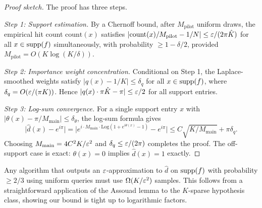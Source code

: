 \begin{proof}[Proof sketch]
The proof has three steps.

\emph{Step 1: Support estimation.}  By a Chernoff bound, after $M_{\mathrm{pilot}}$ uniform draws, the empirical hit count $\mathrm{count}(x)$ satisfies $|\mathrm{count}(x)/M_{\mathrm{pilot}} - 1/N| \leq \varepsilon/(2\pi\hat{K})$ for all $x\in\operatorname{supp}(f)$ simultaneously, with probability $\geq 1-\delta/2$, provided $M_{\mathrm{pilot}} = O(K\log(K/\delta))$.

\emph{Step 2: Importance weight concentration.}  Conditional on Step 1, the Laplace-smoothed weights satisfy $|q(x) - 1/K| \leq \delta_q$ for all $x\in\operatorname{supp}(f)$, where $\delta_q = O(\varepsilon/(\pi K))$.  Hence $|q(x)\cdot\pi\hat{K} - \pi| \leq \varepsilon/2$ for all support entries.

\emph{Step 3: Log-sum convergence.}  For a single support entry $x$ with $|\theta(x) - \pi/M_{\mathrm{main}}| \leq \delta_\theta$, the log-sum formula gives
\[
  \bigl|\hat{d}(x) - e^{i\pi}\bigr| = \bigl|e^{i\cdot M_{\mathrm{main}}\cdot\mathrm{Log}(1 + e^{i\theta(x)}-1)} - e^{i\pi}\bigr| \leq C\sqrt{K/M_{\mathrm{main}}} + \pi\delta_q.
\]
Choosing $M_{\mathrm{main}} = 4C^2K/\varepsilon^2$ and $\delta_q \leq \varepsilon/(2\pi)$ completes the proof.  The off-support case is exact: $\theta(x)=0$ implies $\hat{d}(x) = 1$ exactly.
\end{proof}

\begin{remark}
Any algorithm that outputs an $\varepsilon$-approximation to $\hat{d}$ on $\operatorname{supp}(f)$ with probability $\geq 2/3$ using uniform queries must use $\Omega(K/\varepsilon^2)$ samples.  This follows from a straightforward application of the Assouad lemma to the $K$-sparse hypothesis class, showing our bound is tight up to logarithmic factors.
\end{remark}

